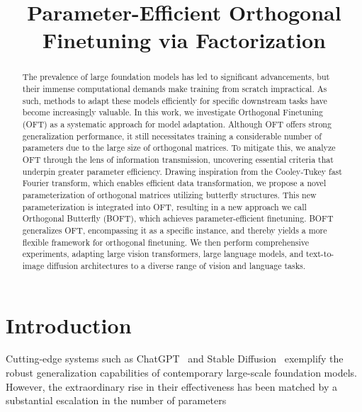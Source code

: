 \title{Parameter-Efficient Orthogonal Finetuning via Factorization}

\begin{abstract}
The prevalence of large foundation models has led to significant advancements, but their immense computational demands make training from scratch impractical. As such, methods to adapt these models efficiently for specific downstream tasks have become increasingly valuable. In this work, we investigate Orthogonal Finetuning (OFT) as a systematic approach for model adaptation. Although OFT offers strong generalization performance, it still necessitates training a considerable number of parameters due to the large size of orthogonal matrices. To mitigate this, we analyze OFT through the lens of information transmission, uncovering essential criteria that underpin greater parameter efficiency. Drawing inspiration from the Cooley-Tukey fast Fourier transform, which enables efficient data transformation, we propose a novel parameterization of orthogonal matrices utilizing butterfly structures. This new parameterization is integrated into OFT, resulting in a new approach we call Orthogonal Butterfly (BOFT), which achieves parameter-efficient finetuning. BOFT generalizes OFT, encompassing it as a specific instance, and thereby yields a more flexible framework for orthogonal finetuning. We then perform comprehensive experiments, adapting large vision transformers, large language models, and text-to-image diffusion architectures to a diverse range of vision and language tasks.
\end{abstract}

\section{Introduction}

Cutting-edge systems such as ChatGPT~\cite{brown2020language,chen2021evaluating} and Stable Diffusion~\cite{rombach2022high} exemplify the robust generalization capabilities of contemporary large-scale foundation models. However, the extraordinary rise in their effectiveness has been matched by a substantial escalation in the number of parameters

